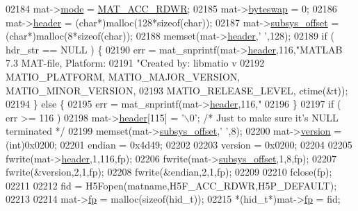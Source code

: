 \begin{DoxyCode}
{{{{{{{02184     mat->\hyperlink{struct__mat__t_aa43288b63b8edb7cadf0b79e2d1df2ee}{mode}     = \hyperlink{group___m_a_t_ggaa9dcbc70f538af79bd557593ff6b5cdba0f65f27ea42fde32d62b702b82329c1f}{MAT\_ACC\_RDWR};
02185     mat->\hyperlink{struct__mat__t_a99d207977af5e04941ace56d71817a40}{byteswap} = 0;
02186     mat->\hyperlink{struct__mat__t_a5ed5d0e4e3c4d76b626a8a1772d579c4}{header}   = (\textcolor{keywordtype}{char}*)malloc(128*\textcolor{keyword}{sizeof}(\textcolor{keywordtype}{char}));
02187     mat->\hyperlink{struct__mat__t_a19317c01209959d755d69311960d3eec}{subsys\_offset} = (\textcolor{keywordtype}{char}*)malloc(8*\textcolor{keyword}{sizeof}(\textcolor{keywordtype}{char}));
02188     memset(mat->\hyperlink{struct__mat__t_a5ed5d0e4e3c4d76b626a8a1772d579c4}{header},\textcolor{charliteral}{' '},128);
02189     \textcolor{keywordflow}{if} ( hdr\_str == NULL ) \{
02190         err = mat\_snprintf(mat->\hyperlink{struct__mat__t_a5ed5d0e4e3c4d76b626a8a1772d579c4}{header},116,\textcolor{stringliteral}{"MATLAB 7.3 MAT-file, Platform: %
02191                 \textcolor{stringliteral}{"Created by: libmatio v%
02192                 MATIO\_PLATFORM, MATIO\_MAJOR\_VERSION, MATIO\_MINOR\_VERSION,
02193                 MATIO\_RELEASE\_LEVEL, ctime(&t));
02194     \} \textcolor{keywordflow}{else} \{
02195         err = mat\_snprintf(mat->\hyperlink{struct__mat__t_a5ed5d0e4e3c4d76b626a8a1772d579c4}{header},116,\textcolor{stringliteral}{"%
02196     \}
02197     \textcolor{keywordflow}{if} ( err >= 116 )
02198         mat->\hyperlink{struct__mat__t_a5ed5d0e4e3c4d76b626a8a1772d579c4}{header}[115] = \textcolor{charliteral}{'\(\backslash\)0'}; \textcolor{comment}{/* Just to make sure it's NULL terminated */}
02199     memset(mat->\hyperlink{struct__mat__t_a19317c01209959d755d69311960d3eec}{subsys\_offset},\textcolor{charliteral}{' '},8);
02200     mat->\hyperlink{struct__mat__t_a729c2bc0afc97485057a5af425635b1a}{version} = (int)0x0200;
02201     endian = 0x4d49;
02202 
02203     version = 0x0200;
02204 
02205     fwrite(mat->\hyperlink{struct__mat__t_a5ed5d0e4e3c4d76b626a8a1772d579c4}{header},1,116,fp);
02206     fwrite(mat->\hyperlink{struct__mat__t_a19317c01209959d755d69311960d3eec}{subsys\_offset},1,8,fp);
02207     fwrite(&version,2,1,fp);
02208     fwrite(&endian,2,1,fp);
02209 
02210     fclose(fp);
02211 
02212     fid = H5Fopen(matname,H5F\_ACC\_RDWR,H5P\_DEFAULT);
02213 
02214     mat->\hyperlink{struct__mat__t_a85f562e407ca9ad4d2a6e14f839432b7}{fp} = malloc(\textcolor{keyword}{sizeof}(hid\_t));
02215     *(hid\_t*)mat->\hyperlink{struct__mat__t_a85f562e407ca9ad4d2a6e14f839432b7}{fp} = fid;
}}}}}}}}}}
\end{DoxyCode}
